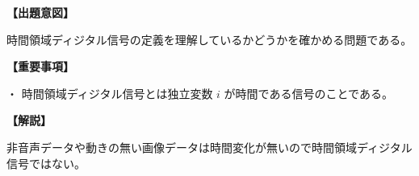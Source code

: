 \noindent \textbf{【出題意図】}

\noindent 時間領域ディジタル信号の定義を理解しているかどうかを確かめる問題である。

\vspace{1em}
\noindent \textbf{【重要事項】}

\medskip
\noindent ・ 時間領域ディジタル信号とは独立変数 $i$ が時間である信号のことである。

\vspace{1em}
\noindent \textbf{【解説】}

\noindent 非音声データや動きの無い画像データは時間変化が無いので時間領域ディジタル信号ではない。
